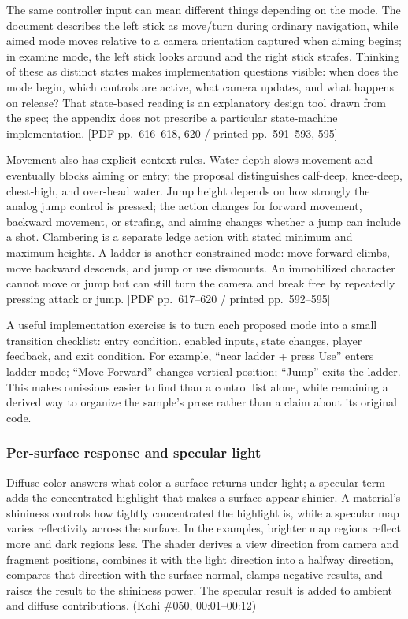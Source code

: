 The same controller input can mean different things depending on the mode. The document describes the left stick as move/turn during ordinary navigation, while aimed mode moves relative to a camera orientation captured when aiming begins; in examine mode, the left stick looks around and the right stick strafes. Thinking of these as distinct states makes implementation questions visible: when does the mode begin, which controls are active, what camera updates, and what happens on release? That state-based reading is an explanatory design tool drawn from the spec; the appendix does not prescribe a particular state-machine implementation. {[}PDF pp.~616--618, 620 / printed pp.~591--593, 595{]}

Movement also has explicit context rules. Water depth slows movement and eventually blocks aiming or entry; the proposal distinguishes calf-deep, knee-deep, chest-high, and over-head water. Jump height depends on how strongly the analog jump control is pressed; the action changes for forward movement, backward movement, or strafing, and aiming changes whether a jump can include a shot. Clambering is a separate ledge action with stated minimum and maximum heights. A ladder is another constrained mode: move forward climbs, move backward descends, and jump or use dismounts. An immobilized character cannot move or jump but can still turn the camera and break free by repeatedly pressing attack or jump. {[}PDF pp.~617--620 / printed pp.~592--595{]}

A useful implementation exercise is to turn each proposed mode into a small transition checklist: entry condition, enabled inputs, state changes, player feedback, and exit condition. For example, ``near ladder + press Use'' enters ladder mode; ``Move Forward'' changes vertical position; ``Jump'' exits the ladder. This makes omissions easier to find than a control list alone, while remaining a derived way to organize the sample's prose rather than a claim about its original code.

\subsubsection{Per-surface response and specular light}\label{06-engine-ii-ch026-per-surface-response-and-specular-light}

\hypertarget{06-engine-ii-ch026-per-surface-response-and-specular-light}{}

Diffuse color answers what color a surface returns under light; a specular term adds the concentrated highlight that makes a surface appear shinier. A material's shininess controls how tightly concentrated the highlight is, while a specular map varies reflectivity across the surface. In the examples, brighter map regions reflect more and dark regions less. The shader derives a view direction from camera and fragment positions, combines it with the light direction into a halfway direction, compares that direction with the surface normal, clamps negative results, and raises the result to the shininess power. The specular result is added to ambient and diffuse contributions. (Kohi \#050, 00:01--00:12)

